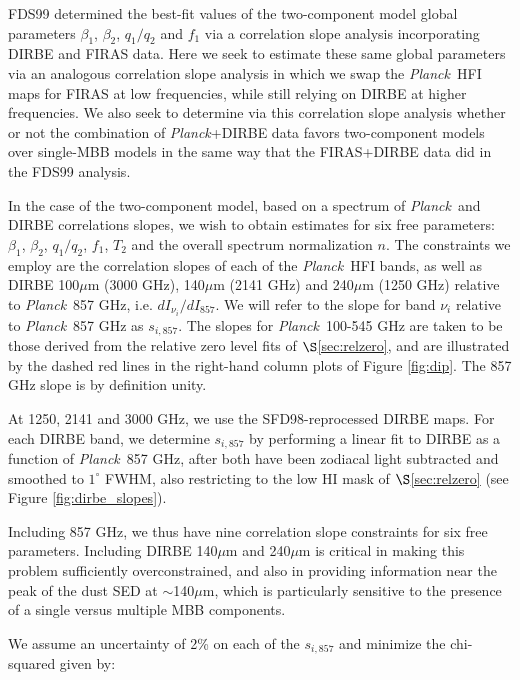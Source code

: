 \documentclass{emulateapj}
\newcommand{\PLANCK}{{\it Planck}}
\begin{document}
FDS99 determined the best-fit values of the two-component model global 
parameters $\beta_1$, $\beta_2$, $q_1/q_2$ and $f_1$ via a correlation slope
analysis incorporating DIRBE and FIRAS data. Here we seek to estimate these 
same global parameters via an analogous correlation slope analysis in which we 
swap the \PLANCK~HFI maps for FIRAS at low frequencies, while still relying on 
DIRBE at higher frequencies. We also seek to determine via this correlation 
slope analysis whether or not the combination of \PLANCK+DIRBE data favors 
two-component models over single-MBB models in the same way that the 
FIRAS+DIRBE data did in the FDS99 analysis.

In the case of the two-component model, based on a spectrum of \PLANCK~and 
DIRBE correlations slopes, we wish to obtain estimates for six free parameters:
$\beta_1$, $\beta_2$, $q_1/q_2$, $f_1$, $T_2$ and the overall spectrum 
normalization $n$. The constraints we employ are the correlation slopes of each
of the \PLANCK~HFI bands, as well as DIRBE 100$\mu$m (3000 GHz), 140$\mu$m 
(2141 GHz) and 240$\mu$m (1250 GHz) relative to \PLANCK~857 GHz, i.e. 
$dI_{\nu_i}/dI_{857}$. We will refer to the slope for band $\nu_i$ relative to 
\PLANCK~857 GHz as $s_{i,857}$. The slopes for \PLANCK~100-545 GHz are taken 
to be those derived from the relative zero level fits of $\S$\ref{sec:relzero},
and are illustrated by the dashed red lines in the right-hand column plots of 
Figure \ref{fig:dip}. The 857 GHz slope is by definition unity.

At 1250, 2141 and 3000 GHz, we use the SFD98-reprocessed DIRBE maps. For each
DIRBE band, we determine $s_{i, 857}$ by performing a linear fit to DIRBE as a 
function of \PLANCK~857 GHz, after both have been zodiacal light subtracted and
smoothed to $1^{\circ}$ FWHM, also restricting to the low HI mask of 
$\S$\ref{sec:relzero} (see Figure \ref{fig:dirbe_slopes}).

Including 857 GHz, we thus have nine correlation slope constraints for six 
free parameters. Including DIRBE 140$\mu$m and 240$\mu$m is critical in making 
this problem sufficiently overconstrained, and also in providing information 
near the peak of the dust SED at $\sim$140$\mu$m, which is particularly 
sensitive to the presence of a single versus multiple MBB components. 

We assume an uncertainty of 2\% on each of the $s_{i, 857}$ and minimize the 
chi-squared given by:
\end{document}
